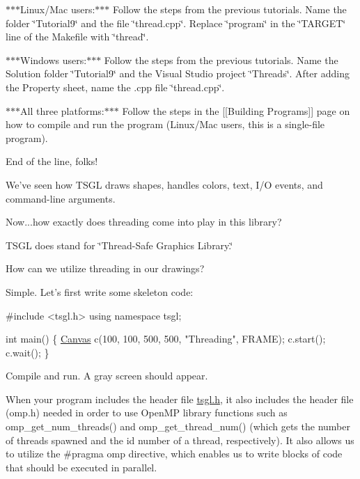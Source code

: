$\ast$$\ast$$\ast$\-Linux/\-Mac users\-:$\ast$$\ast$$\ast$ Follow the steps from the previous tutorials. Name the folder \char`\"{}\-Tutorial9\char`\"{} and the file \char`\"{}thread.\-cpp\char`\"{}. Replace \char`\"{}program\char`\"{} in the \char`\"{}\-T\-A\-R\-G\-E\-T\char`\"{} line of the Makefile with \char`\"{}thread\char`\"{}.

$\ast$$\ast$$\ast$\-Windows users\-:$\ast$$\ast$$\ast$ Follow the steps from the previous tutorials. Name the Solution folder \char`\"{}\-Tutorial9\char`\"{} and the Visual Studio project \char`\"{}\-Threads\char`\"{}. After adding the Property sheet, name the .cpp file \char`\"{}thread.\-cpp\char`\"{}.

$\ast$$\ast$$\ast$\-All three platforms\-:$\ast$$\ast$$\ast$ Follow the steps in the \mbox{[}\mbox{[}Building Programs\mbox{]}\mbox{]} page on how to compile and run the program (Linux/\-Mac users, this is a single-\/file program).

End of the line, folks!

We've seen how T\-S\-G\-L draws shapes, handles colors, text, I/\-O events, and command-\/line arguments.

Now...how exactly does threading come into play in this library?

T\-S\-G\-L does stand for \char`\"{}\-Thread-\/\-Safe Graphics Library.\char`\"{}

How can we utilize threading in our drawings?

Simple. Let's first write some skeleton code\-:


\begin{DoxyCode}
\textcolor{preprocessor}{#include <tsgl.h>}
\textcolor{keyword}{using namespace }tsgl;

\textcolor{keywordtype}{int} main() \{
  \hyperlink{classtsgl_1_1_canvas}{Canvas} c(100, 100, 500, 500, \textcolor{stringliteral}{"Threading"}, FRAME);
  c.start();
  c.wait();
\}
\end{DoxyCode}


Compile and run. A gray screen should appear.

When your program includes the header file {\ttfamily \hyperlink{tsgl_8h_source}{tsgl.\-h}}, it also includes the header file ({\ttfamily omp.\-h}) needed in order to use Open\-M\-P library functions such as {\ttfamily omp\-\_\-get\-\_\-num\-\_\-threads()} and {\ttfamily omp\-\_\-get\-\_\-thread\-\_\-num()} (which gets the number of threads spawned and the id number of a thread, respectively). It also allows us to utilize the {\ttfamily \#pragma omp} directive, which enables us to write blocks of code that should be executed in parallel.

